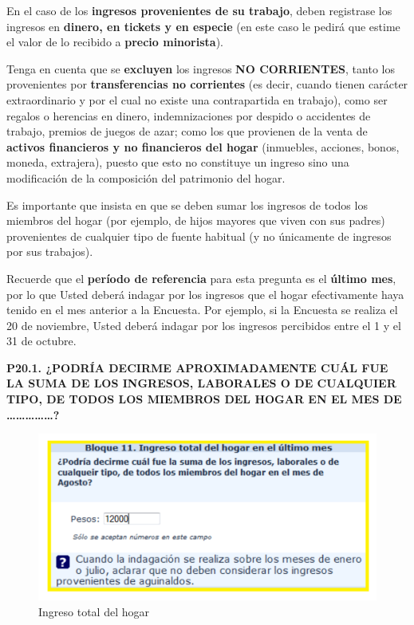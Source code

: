 \documentclass[
  openany]{book}
\begin{document}
En el caso de los \textbf{ingresos provenientes de su trabajo}, deben registrase los ingresos en \textbf{dinero, en tickets y en especie} (en este caso le pedirá que estime el valor de lo recibido a \textbf{precio minorista}).

Tenga en cuenta que se \textbf{excluyen} los ingresos \textbf{NO CORRIENTES}, tanto los provenientes por \textbf{transferencias no corrientes} (es decir, cuando tienen carácter extraordinario y por el cual no existe una contrapartida en trabajo), como ser regalos o herencias en dinero, indemnizaciones por despido o accidentes de trabajo, premios de juegos de azar; como los que provienen de la venta de \textbf{activos financieros y no financieros del hogar} (inmuebles, acciones, bonos, moneda, extrajera), puesto que esto no constituye un ingreso sino una modificación de la composición del patrimonio del hogar.

Es importante que insista en que se deben sumar los ingresos de todos los miembros del hogar (por ejemplo, de hijos mayores que viven con sus padres) provenientes de cualquier tipo de fuente habitual (y no únicamente de ingresos por sus trabajos).

Recuerde que el \textbf{período de referencia} para esta pregunta es el \textbf{último mes}, por lo que Usted deberá indagar por los ingresos que el hogar efectivamente haya tenido en el mes anterior a la Encuesta. Por ejemplo, si la Encuesta se realiza el 20 de noviembre, Usted deberá indagar por los ingresos percibidos entre el 1 y el 31 de octubre.

\textbf{P20.1. ¿PODRÍA DECIRME APROXIMADAMENTE CUÁL FUE LA SUMA DE LOS INGRESOS, LABORALES O DE CUALQUIER TIPO, DE TODOS LOS MIEMBROS DEL HOGAR EN EL MES DE \ldots\ldots\ldots\ldots\ldots?}

\begin{figure}

{\centering \includegraphics[width=1\linewidth]{imagenes/figura6-61} 

}

\caption{Ingreso total del hogar}\label{fig:bloque11}
\end{figure}
\end{document}
